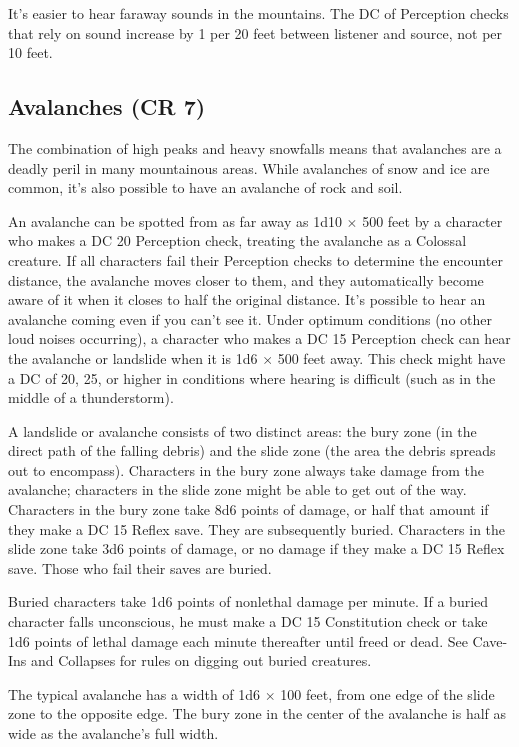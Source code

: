 It's easier to hear faraway sounds in the mountains. The DC of Perception checks that rely on sound increase by 1 per 20 feet between listener and source, not per 10 feet.
				
\subsection{Avalanches (CR 7)}

				
The combination of high peaks and heavy snowfalls means that avalanches are a deadly peril in many mountainous areas. While avalanches of snow and ice are common, it's also possible to have an avalanche of rock and soil.
				
An avalanche can be spotted from as far away as 1d10 \mbox{$\times$} 500 feet by a character who makes a DC 20 Perception check, treating the avalanche as a Colossal creature. If all characters fail their Perception checks to determine the encounter distance, the avalanche moves closer to them, and they automatically become aware of it when it closes to half the original distance. It's possible to hear an avalanche coming even if you can't see it. Under optimum conditions (no other loud noises occurring), a character who makes a DC 15 Perception check can hear the avalanche or landslide when it is 1d6 \mbox{$\times$} 500 feet away. This check might have a DC of 20, 25, or higher in conditions where hearing is difficult (such as in the middle of a thunderstorm). 
				
A landslide or avalanche consists of two distinct areas: the bury zone (in the direct path of the falling debris) and the slide zone (the area the debris spreads out to encompass). Characters in the bury zone always take damage from the avalanche; characters in the slide zone might be able to get out of the way. Characters in the bury zone take 8d6 points of damage, or half that amount if they make a DC 15 Reflex save. They are subsequently buried. Characters in the slide zone take 3d6 points of damage, or no damage if they make a DC 15 Reflex save. Those who fail their saves are buried. 
				
Buried characters take 1d6 points of nonlethal damage per minute. If a buried character falls unconscious, he must make a DC 15 Constitution check or take 1d6 points of lethal damage each minute thereafter until freed or dead. See Cave-Ins and Collapses for rules on digging out buried creatures.
				
The typical avalanche has a width of 1d6 \mbox{$\times$} 100 feet, from one edge of the slide zone to the opposite edge. The bury zone in the center of the avalanche is half as wide as the avalanche's full width.
				
